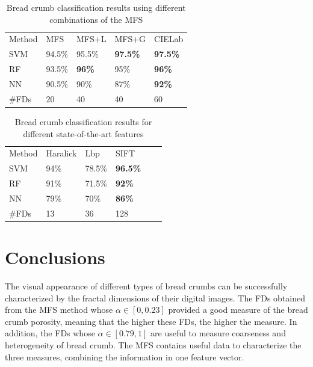 \begin{table}
\caption{Bread crumb classification results using different combinations of the MFS}
\label{tab:mfs}       %
\begin{tabular}{lllll}
\hline\noalign{\smallskip}
Method & MFS & MFS+L & MFS+G & CIELab  \\
\noalign{\smallskip}\hline\noalign{\smallskip}
SVM & 94.5\% & 95.5\% & \textbf{97.5\%} & \textbf{97.5\%} \\
RF  & 93.5\% & \textbf{96\%} & 95\% & \textbf{96\%} \\
NN & 90.5\% & 90\% & 87\% & \textbf{92\%} \\
\noalign{\smallskip}\hline
\#FDs & 20 & 40 & 40 & 60 \\
\hline
\end{tabular}
\end{table}


\begin{table}
\caption{Bread crumb classification results for different state-of-the-art features}
\label{tab:other}       %
\begin{tabular}{llllll}
\hline\noalign{\smallskip}
Method & Haralick & Lbp & SIFT\\ %
\noalign{\smallskip}\hline\noalign{\smallskip}
SVM & 94\% & 78.5\% & \textbf{96.5\%} \\ %
RF  & 91\% & 71.5\% & \textbf{92\%} \\ %
NN & 79\% & 70\% & \textbf{86\%} \\ %
\noalign{\smallskip}\hline
\#FDs & 13 & 36 & 128 \\
\hline
\end{tabular}
\end{table}




\section{Conclusions}
\label{sec:11}
The visual appearance of different types of bread crumbs can be successfully characterized by the fractal dimensions of their digital images. The FDs obtained from the MFS method whose $\alpha \in [0,0.23]$ provided a good measure of the bread crumb porosity, meaning that the higher these FDs, the higher the measure. In addition, the FDs whose $\alpha \in [0.79,1]$ are useful to measure coarseness and heterogeneity of bread crumb. The MFS contains useful data to characterize the three measures, combining the information in one feature vector.

